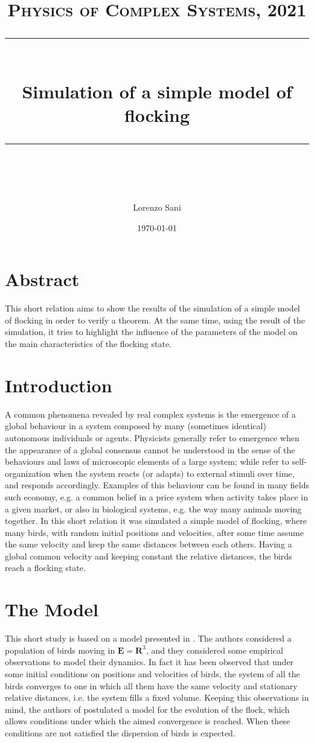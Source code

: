 \documentclass{article} %
\title{
\normalfont \normalsize 
\textsc{Physics of Complex Systems, 2021} \\ 
[10pt] 
\rule{\linewidth}{0.5pt} \\[6pt] 
\huge 
Simulation of a simple model of flocking
\rule{\linewidth}{2pt}  \\[10pt]
}
\author{Lorenzo Sani}
\date{\normalsize \today}
\newcounter{other}
\newcounter{math}
\newcounter{late}
\begin{document}
\maketitle

\tableofcontents

\section{Abstract}
This short relation aims to show the results of the simulation of a simple model of flocking
in order to verify a theorem. At the same time, using the result of the simulation, it tries
to highlight the influence of the parameters of the model on the main characteristics of 
the flocking state.

\section{Introduction}
A common phenomena revealed by real complex systems is the emergence of a global 
behaviour in a system composed by many (sometimes identical) autonomous individuals or 
agents.
Physicists generally refer to emergence when the appearance of a global consensus cannot
be understood in the sense of the behaviours and laws of microscopic elements of a large
system; while refer to self-organization when the system reacts (or adapts) to external 
stimuli over time, and responds accordingly.
Examples of this behaviour can be found in many fields such economy, e.g. a 
common belief in a price system when activity takes place in a given market, or also
in biological systems, e.g. the way many animals moving together.
In this short relation it was simulated a simple model of flocking, where many birds,
with random initial positions and velocities, after some time assume the same velocity
and keep the same distances between each others. Having a global common velocity and 
keeping constant the relative distances, the birds reach a flocking state.

\section {The Model}
This short study is based on a model presented in \cite{CuckerSmale} . The authors considered 
a population of birds moving in $\mathbf{E}=\mathbf{R}^3$, and they
considered some empirical observations to model their dynamics.
In fact it has been observed that under some
initial conditions on positions and velocities of birds, 
the system of all the birds converges to one in which all them have the same velocity and 
stationary relative distances, i.e. the system fills a fixed volume.
Keeping this observations in mind, the authors of \cite{CuckerSmale} postulated a 
model for the evolution of the flock, which allows conditions under which the aimed convergence 
is reached. When these conditions are not satisfied the dispersion of birds is expected.
\end{document}
